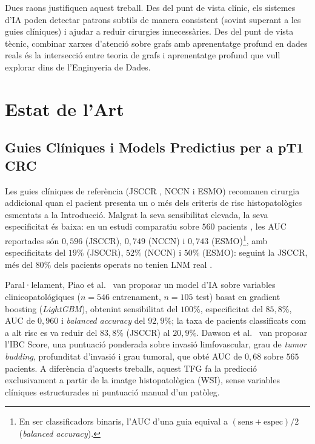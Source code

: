 \documentclass[10pt,a4paper,twocolumn,twoside]{article}
\begin{document}
Dues raons justifiquen aquest treball. Des del punt de vista clínic, els sistemes d'IA poden
detectar patrons subtils de manera consistent (sovint superant a les guies clíniques) i ajudar a reduir cirurgies
innecessàries. Des del punt de vista tècnic, combinar xarxes d'atenció sobre grafs amb
aprenentatge profund en dades reals és la intersecció entre teoria de grafs i aprenentatge profund
que vull explorar dins de l'Enginyeria de Dades.

\section{Estat de l'Art}

\subsection{Guies Clíniques i Models Predictius per a pT1 CRC}
\label{sec:guidelines-sota}

Les guies clíniques de referència (JSCCR \cite{jsccr2019}, NCCN i
ESMO) recomanen cirurgia addicional quan el pacient
presenta un o més dels criteris de risc histopatològics esmentats a la
Introducció. Malgrat la seva sensibilitat elevada, la seva especificitat
és baixa: en un estudi comparatiu sobre $560$ pacients
\cite{tanino2024comparative}, les AUC reportades són $0{,}596$ (JSCCR),
$0{,}749$ (NCCN) i $0{,}743$ (ESMO)\footnote{En ser classificadors binaris, l'AUC
d'una guia equival a $(\text{sens}+\text{espec})/2$ (\textit{balanced accuracy}).},
amb especificitats del $19\%$ (JSCCR), $52\%$ (NCCN) i $50\%$ (ESMO):
seguint la JSCCR, més del $80\%$ dels pacients operats no tenien LNM
real \cite{tanino2024comparative,zaffalon2023}.

Paral·lelament, Piao et al.~\cite{piao2023ai} van proposar un model
d'IA sobre variables clinicopatológiques ($n\!=\!546$ entrenament,
$n\!=\!105$ test) basat en gradient boosting (\textit{LightGBM}),
obtenint sensibilitat del $100\%$, especificitat del $85{,}8\%$, AUC de
$0{,}960$ i \textit{balanced accuracy} del $92{,}9\%$; la taxa de
pacients classificats com a alt risc es va reduir del $83{,}8\%$ (JSCCR)
al $20{,}9\%$. Dawson et al.~\cite{dawson2024budding} van proposar
l'IBC Score, una puntuació ponderada sobre invasió limfovascular, grau de
\textit{tumor budding}, profunditat d'invasió i grau tumoral,
que obté AUC de $0{,}68$ sobre $565$ pacients. A diferència d'aquests
treballs, aquest TFG fa la predicció exclusivament a partir de la
imatge histopatològica (WSI), sense variables clíniques
estructurades ni puntuació manual d'un patòleg.
\end{document}
